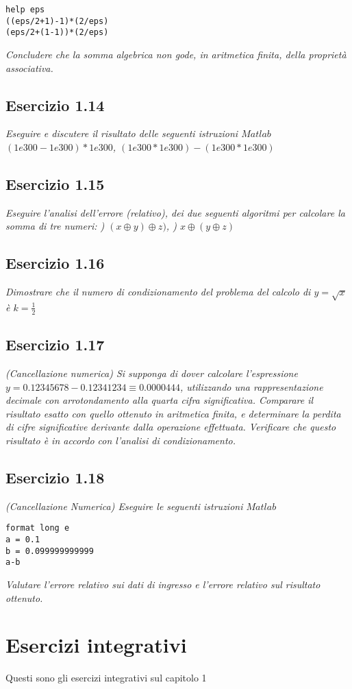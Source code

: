 \lstset{language=Matlab}
\begin{lstlisting}
help eps
((eps/2+1)-1)*(2/eps)
(eps/2+(1-1))*(2/eps)
\end{lstlisting}
\emph{Concludere che la somma algebrica non gode, in aritmetica finita, della proprietà associativa.}
\subsection{Esercizio 1.14}
\emph{Eseguire e discutere il risultato delle seguenti istruzioni $Matlab$}
\emph{\center $(1e300-1e300)*1e300$, \qquad $(1e300*1e300)-(1e300*1e300)$}
\flushleft
\subsection{Esercizio 1.15}
\emph{Eseguire l'analisi dell'errore (relativo), dei due seguenti algoritmi per calcolare la somma di tre numeri:
) $ (x\oplus y) \oplus z) $, ) $x\oplus(y\oplus z)$
\flushleft }
\subsection{Esercizio 1.16}
\emph{Dimostrare che il numero di condizionamento del problema del calcolo di $ y = \sqrt{x} $ è $ k = \frac{1}{2}$}
\subsection{Esercizio 1.17}
\emph{(Cancellazione numerica) Si supponga di dover calcolare l'espressione 
\center $ y = 0.12345678-0.12341234 \equiv 0.0000444$,
\flushleft utilizzando una rappresentazione decimale con arrotondamento alla quarta cifra significativa. Comparare il risultato esatto con quello ottenuto in aritmetica finita, e determinare la perdita di cifre significative derivante dalla operazione effettuata. Verificare che questo risultato è in accordo con l'analisi di condizionamento.}
\subsection{Esercizio 1.18}
\emph{(Cancellazione Numerica) Eseguire le seguenti istruzioni $Matlab$}

\lstset{language=Matlab}
\begin{lstlisting}
format long e
a = 0.1 
b = 0.099999999999
a-b
\end{lstlisting}
\emph{Valutare l'errore relativo sui dati di ingresso e l'errore relativo sul risultato ottenuto.}
\section{Esercizi integrativi}
Questi sono gli esercizi integrativi sul capitolo 1
